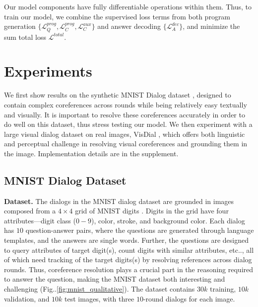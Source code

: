 \documentclass[runningheads]{llncs}
\makeatletter
\DeclareRobustCommand\onedot{\futurelet\@let@token\@onedot}
\def\@onedot{\ifx\@let@token.\else.\null\fi\xspace}
\def\etc{etc\onedot} \def\vs{vs\onedot}
\def\Fig{Fig\onedot}
\def\vs{vs\onedot}
\newcommand{\myparagraph}[1]{\vspace{0pt}\noindent{\bf #1}}
\newcommand{\addresults}[1]{}
\makeatother
\begin{document}
\myparagraph{Training Details.}
Our model components have fully differentiable operations within them.
Thus, to train our model, we combine the supervised loss terms from both
program generation 
$\{\mathcal{L}_Q^{prog}, \mathcal{L}_C^{prog}, \mathcal{L}_C^{aux}\}$
and answer decoding $\{\mathcal{L}^{dec}_A\}$, and minimize the sum total loss 
$\mathcal{L}^{total}$.
% 
\section{Experiments}
\addresults{We  show results on the synthetic
MNIST Dialog dataset \cite{paul2017visual} with complex coreferences across rounds and a large dialog dataset on real 
images,  VisDial \cite{visdial}.}

We first show results on the synthetic
MNIST Dialog dataset \cite{paul2017visual}, 
designed to contain complex coreferences across rounds while being relatively 
easy textually and visually.
It is important to resolve these coreferences accurately in order to do 
well on this dataset, thus stress testing our model.
We then experiment with a large visual dialog dataset on real 
images,  VisDial \cite{visdial},
which offers both
linguistic and perceptual challenge in resolving visual coreferences and
grounding them in the image.
Implementation details are in the supplement.


\subsection{MNIST Dialog Dataset}


\noindent
\textbf{Dataset.}
The dialogs in the MNIST dialog dataset \cite{paul2017visual} are grounded in
images composed from a $4 \times 4$ grid of MNIST digits \cite{lecun-mnisthandwrittendigit-2010}.
Digits in the grid have four attributes---digit class ($0-9$), 
color, stroke, and background color.
Each dialog has $10$ question-answer pairs, where the questions are
generated through language templates, and the answers are single words.
Further, the questions are designed to query attributes of target digit(s),
count digits with similar attributes, \etc, all of which need tracking of the
target digits(s) by resolving references across dialog rounds.
Thus, coreference resolution plays a crucial part in the reasoning required to
answer the question, making the MNIST dataset both interesting and challenging
(\Fig\ref{fig:mnist_qualitative}).
The dataset contains $30k$ training, $10k$ validation, and $10k$ test images,
with three $10$-round dialogs for each image.
\end{document}
